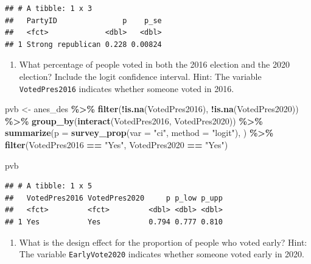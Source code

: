 \documentclass[
]{krantz}
\makeatletter
\newenvironment{Shaded}{\begin{snugshade}}{\end{snugshade}}
\newcommand{\AttributeTok}[1]{\textcolor[rgb]{0.27,0.27,0.27}{#1}}
\newcommand{\FunctionTok}[1]{\textcolor[rgb]{0.27,0.27,0.27}{\textbf{#1}}}
\newcommand{\NormalTok}[1]{#1}
\newcommand{\OtherTok}[1]{\textcolor[rgb]{0.37,0.37,0.37}{#1}}
\newcommand{\SpecialCharTok}[1]{\textcolor[rgb]{0.43,0.43,0.43}{\textbf{#1}}}
\newcommand{\StringTok}[1]{\textcolor[rgb]{0.5,0.5,0.5}{#1}}
\providecommand{\tightlist}{%
  \setlength{\itemsep}{0pt}\setlength{\parskip}{0pt}}
\newenvironment{kframe}{%
\medskip{}
\setlength{\fboxsep}{.8em}
 \def\at@end@of@kframe{}%
 \ifinner\ifhmode%
  \def\at@end@of@kframe{\end{minipage}}%
  \begin{minipage}{\columnwidth}%
 \fi\fi%
 \def\FrameCommand##1{\hskip\@totalleftmargin \hskip-\fboxsep
 \colorbox{shadecolor}{##1}\hskip-\fboxsep
     \hskip-\linewidth \hskip-\@totalleftmargin \hskip\columnwidth}%
 \MakeFramed {\advance\hsize-\width
   \@totalleftmargin\z@ \linewidth\hsize
   \@setminipage}}%
 {\par\unskip\endMakeFramed%
 \at@end@of@kframe}
\renewenvironment{Shaded}{\begin{kframe}}{\end{kframe}}
\makeatother
\begin{document}
\begin{verbatim}
## # A tibble: 1 x 3
##   PartyID               p    p_se
##   <fct>             <dbl>   <dbl>
## 1 Strong republican 0.228 0.00824
\end{verbatim}

\begin{enumerate}
\def\labelenumi{\arabic{enumi}.}
\setcounter{enumi}{3}
\tightlist
\item
  What percentage of people voted in both the 2016 election and the 2020 election? Include the logit confidence interval. Hint: The variable \texttt{VotedPres2016} indicates whether someone voted in 2016.
\end{enumerate}

\begin{Shaded}
\begin{Highlighting}[]
\NormalTok{pvb }\OtherTok{\textless{}{-}}\NormalTok{ anes\_des }\SpecialCharTok{\%\textgreater{}\%}
  \FunctionTok{filter}\NormalTok{(}\SpecialCharTok{!}\FunctionTok{is.na}\NormalTok{(VotedPres2016), }\SpecialCharTok{!}\FunctionTok{is.na}\NormalTok{(VotedPres2020)) }\SpecialCharTok{\%\textgreater{}\%}
  \FunctionTok{group\_by}\NormalTok{(}\FunctionTok{interact}\NormalTok{(VotedPres2016, VotedPres2020)) }\SpecialCharTok{\%\textgreater{}\%}
  \FunctionTok{summarize}\NormalTok{(}\AttributeTok{p =} \FunctionTok{survey\_prop}\NormalTok{(}\AttributeTok{var =} \StringTok{"ci"}\NormalTok{, }\AttributeTok{method =} \StringTok{"logit"}\NormalTok{), ) }\SpecialCharTok{\%\textgreater{}\%}
  \FunctionTok{filter}\NormalTok{(VotedPres2016 }\SpecialCharTok{==} \StringTok{"Yes"}\NormalTok{, VotedPres2020 }\SpecialCharTok{==} \StringTok{"Yes"}\NormalTok{)}

\NormalTok{pvb}
\end{Highlighting}
\end{Shaded}

\begin{verbatim}
## # A tibble: 1 x 5
##   VotedPres2016 VotedPres2020     p p_low p_upp
##   <fct>         <fct>         <dbl> <dbl> <dbl>
## 1 Yes           Yes           0.794 0.777 0.810
\end{verbatim}

\begin{enumerate}
\def\labelenumi{\arabic{enumi}.}
\setcounter{enumi}{4}
\tightlist
\item
  What is the design effect for the proportion of people who voted early? Hint: The variable \texttt{EarlyVote2020} indicates whether someone voted early in 2020.
\end{enumerate}
\end{document}
